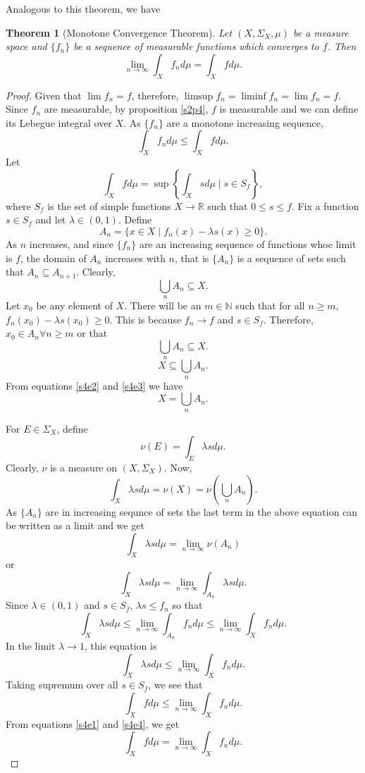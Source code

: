 \documentclass{article}
\newcommand{\sor}{\mathbb{R}}
\newcommand{\son}{\mathbb{N}}
\theoremstyle{plain}
\newtheorem{thm}{Theorem}
\numberwithin{thm}{section}
\theoremstyle{plain}
\numberwithin{prop}{section}
\theoremstyle{definition}
\numberwithin{defn}{section}
\theoremstyle{remark}
\theoremstyle{plain}
\numberwithin{cor}{section}
\numberwithin{equation}{section}
\begin{document}
Analogous to this theorem, we have
\begin{thm}[Monotone Convergence Theorem]\label{s4t2}Let $(X, \Sigma_X, \mu)$ be a 
measure space and $\{f_n\}$ be a sequence of measurable functions which 
converges to $f$. Then 
\[
\lim_{n\rightarrow\infty}\int_X f_n d\mu = \int_X fd\mu.
\]
\end{thm}
\begin{proof}
Given that $\lim f_n = f$, therefore, $\limsup f_n = \liminf f_n = \lim f_n = f$.
Since $f_n$ are measurable, by proposition \ref{s2p4}, $f$ is measurable and
we can define its Lebegue integral over $X$. As $\{f_n\}$ are a monotone
increasing sequence,
\begin{equation}\label{s4e1}
\int_X f_n d\mu \le \int_X fd\mu.
\end{equation}
Let 
\[
\int_X fd\mu = \sup\left\{\int_X s d\mu \;|\; s \in S_f\right\},
\]
where $S_f$ is the set of simple functions $X \rightarrow \sor$ such that
$0 \le s \le f$. Fix a function $s \in S_f$ and let $\lambda \in (0, 1)$. Define
\[
A_n = \{x \in X \;|\; f_n(x) - \lambda s(x) \ge 0\}.
\]
As $n$ increases, and since $\{f_n\}$ are an increasing sequence of functions
whoe limit is $f$, the domain of $A_n$ increases with $n$, that is $\{A_n\}$ 
is a sequence of sets such that $A_n \subseteq A_{n+1}$. Clearly,
\begin{equation}\label{s4e2}
\bigcup_n A_n \subseteq X.
\end{equation}
Let $x_0$ be any element of $X$. There will be an $m \in \son$ such that for
all $n \ge m$, $f_n(x_0) - \lambda s(x_0) \ge 0$. This is because $f_n \rightarrow
f$ and $s \in S_f$. Therefore, $x_0 \in A_n \forall n \ge m$ or that
\[
\bigcup_n A_n \subseteq X.
\]
\begin{equation}\label{s4e3}
X \subseteq \bigcup_n A_n.
\end{equation}
From equations \eqref{s4e2} and \eqref{s4e3} we have
\[
X = \bigcup_n A_n.
\]

For $E \in \Sigma_X$, define
\[
\nu(E) = \int_E \lambda s d\mu.
\]
Clearly, $\nu$ is a measure on $(X, \Sigma_X)$. Now,
\[
\int_X \lambda s d\mu = \nu(X) = \nu\left(\bigcup_n A_n\right).
\]
As $\{A_n\}$ are in increasing sequnce of sets the last term in the above equation
can be written as a limit and we get
\[
\int_X \lambda s d\mu = \lim_{n \rightarrow \infty}\nu(A_n)
\]
or
\[
\int_X \lambda s d\mu = \lim_{n \rightarrow \infty}\int_{A_n}\lambda s d\mu.
\]
Since $\lambda \in (0, 1)$ and $s \in S_f$, $\lambda s \le f_n$ so that
\[
\int_X \lambda s d\mu \le \lim_{n \rightarrow \infty}\int_{A_n}f_n d\mu
\le \lim_{n \rightarrow \infty}\int_X f_n d\mu.
\]
In the limit $\lambda \rightarrow 1$, this equation is
\[
\int_X \lambda s d\mu \le \lim_{n \rightarrow \infty}\int_X f_n d\mu.
\]
Taking supremum over all $s \in S_f$, we see that
\begin{equation}\label{s4e4}
\int_X f d\mu \le \lim_{n \rightarrow \infty}\int_X f_n d\mu.
\end{equation}
From equations \eqref{s4e1} and \eqref{s4e4}, we get
\[
\int_X f d\mu = \lim_{n \rightarrow \infty}\int_X f_n d\mu.
\]
\end{proof}
\end{document}
